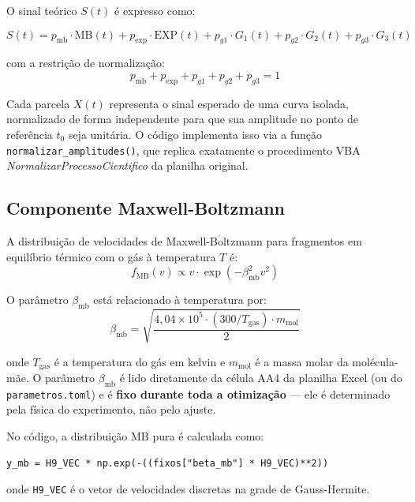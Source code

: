 \documentclass[12pt,a4paper]{report}
\newcommand{\code}[1]{\texttt{#1}}
\begin{document}
O sinal teórico $S(t)$ é expresso como:

\begin{equation}
  \boxed{S(t) = p_{\text{mb}}\cdot\text{MB}(t) + p_{\text{exp}}\cdot\text{EXP}(t)
               + p_{g1}\cdot G_1(t) + p_{g2}\cdot G_2(t) + p_{g3}\cdot G_3(t)}
  \label{eq:modelo}
\end{equation}

com a restrição de normalização:
\begin{equation}
  p_{\text{mb}} + p_{\text{exp}} + p_{g1} + p_{g2} + p_{g3} = 1
  \label{eq:norma}
\end{equation}

Cada parcela $X(t)$ representa o sinal esperado de uma curva isolada,
normalizado de forma independente para que sua amplitude no ponto de
referência $t_0$ seja unitária. O código implementa isso via a função
\code{normalizar\_amplitudes()}, que replica exatamente o procedimento
VBA \textit{NormalizarProcessoCientifico} da planilha original.

\subsection{Componente Maxwell-Boltzmann}

A distribuição de velocidades de Maxwell-Boltzmann para fragmentos em
equilíbrio térmico com o gás à temperatura $T$ é:
\[
  f_{\text{MB}}(v) \propto v \cdot \exp\!\left(-\beta_{\text{mb}}^2 v^2\right)
\]

O parâmetro $\beta_{\text{mb}}$ está relacionado à temperatura por:
\begin{equation}
  \beta_{\text{mb}} = \sqrt{\frac{4{,}04 \times 10^5 \cdot (300/T_{\text{gas}}) \cdot m_{\text{mol}}}{2}}
  \label{eq:betamb}
\end{equation}

onde $T_{\text{gas}}$ é a temperatura do gás em kelvin e $m_{\text{mol}}$ é
a massa molar da molécula-mãe. O parâmetro $\beta_{\text{mb}}$ é lido
diretamente da célula AA4 da planilha Excel (ou do \texttt{parametros.toml})
e é \textbf{fixo durante toda a otimização} — ele é determinado pela física
do experimento, não pelo ajuste.

No código, a distribuição MB pura é calculada como:
\begin{lstlisting}[caption={Distribuição MB na grade de velocidades}]
y_mb = H9_VEC * np.exp(-((fixos["beta_mb"] * H9_VEC)**2))
\end{lstlisting}

onde \code{H9\_VEC} é o vetor de velocidades discretas na grade de
Gauss-Hermite.
\end{document}
